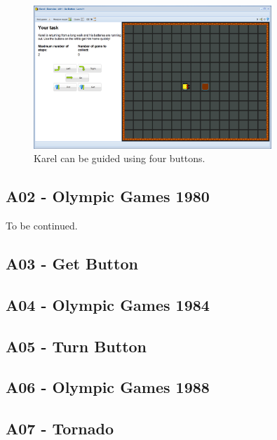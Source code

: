 \documentclass[article,A4,12pt]{llncs}
\begin{document}
\begin{figure}[!ht]
\begin{center}
\includegraphics[width=0.8\textwidth]{img/a01b.png}
\end{center}
\vspace{-4mm}
\caption{Karel can be guided using four buttons.}
\label{fig:a01b}
\vspace{-1cm}
\end{figure}

\newpage

\subsection{A02 - Olympic Games 1980}

To be continued.

\subsection{A03 - Get Button}

\subsection{A04 - Olympic Games 1984}

\subsection{A05 - Turn Button}

\subsection{A06 - Olympic Games 1988 }

\subsection{A07 - Tornado }
\end{document}
